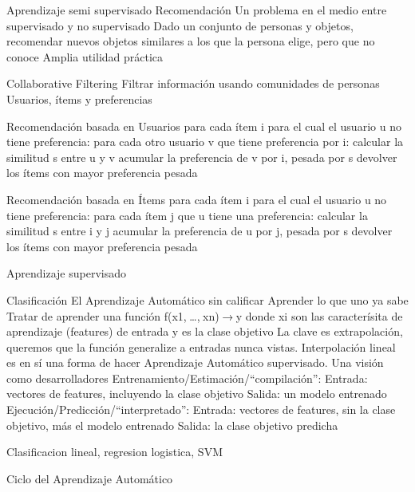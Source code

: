 Aprendizaje semi supervisado
Recomendación
Un problema en el medio entre supervisado y no supervisado
Dado un conjunto de personas y objetos, recomendar nuevos objetos similares a los que la persona elige, pero que no conoce
Amplia utilidad práctica


Collaborative Filtering
Filtrar información usando comunidades de personas
Usuarios, ítems y preferencias

Recomendación basada en Usuarios
para cada ítem i para el cual el usuario u no tiene preferencia:
para cada otro usuario v que tiene preferencia por i:
calcular la similitud s entre u y v
acumular la preferencia de v por i, pesada por s
devolver los ítems con mayor preferencia pesada

Recomendación basada en Ítems
para cada ítem i para el cual el usuario u no tiene preferencia:
para cada ítem j que u tiene una preferencia:
calcular la similitud s entre i y j
acumular la preferencia de u por j, pesada por s
devolver los ítems con mayor preferencia pesada

Aprendizaje supervisado


Clasificación
El Aprendizaje Automático sin calificar
Aprender lo que uno ya sabe
Tratar de aprender una función f(x1, …, xn) → y donde
xi son las caracterísita de aprendizaje (features) de entrada
y es la clase objetivo
La clave es extrapolación, queremos que la función generalize a entradas nunca vistas.
Interpolación lineal es en sí una forma de hacer Aprendizaje Automático supervisado.
Una visión como desarrolladores
Entrenamiento/Estimación/“compilación”:
Entrada: vectores de features, incluyendo la clase objetivo
Salida: un modelo entrenado
Ejecución/Predicción/“interpretado”:
Entrada: vectores de features, sin la clase objetivo, más el modelo entrenado
Salida: la clase objetivo predicha

Clasificacion lineal, regresion logistica, SVM


Ciclo del Aprendizaje Automático

